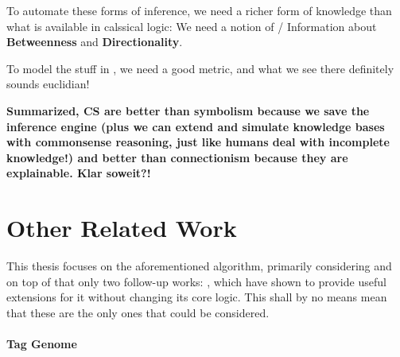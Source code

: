 To automate these forms of inference, we need a richer form of knowledge than what is available in calssical logic: We need a notion of / Information about \textbf{Betweenness} and \textbf{Directionality}.

To model the stuff in \autocite{fig:graphic_reasoning}, we need a good metric, and what we see there definitely sounds euclidian!

\textbf{Summarized, CS are better than symbolism because we save the inference engine (plus we can extend and simulate knowledge bases with commonsense reasoning, just like humans deal with incomplete knowledge!) and better than connectionism because they are explainable. Klar soweit?!}




\section{Other Related Work}
\label{sec:otherwork}

This thesis focuses on the aforementioned algorithm, primarily considering \cite{Derrac2015} and on top of that only two follow-up works: \cite{Ager2018, Alshaikh2020}, which have shown to provide useful extensions for it without changing its core logic. This shall by no means mean that these are the only ones that could be considered.

\paragraph{Tag Genome} 

